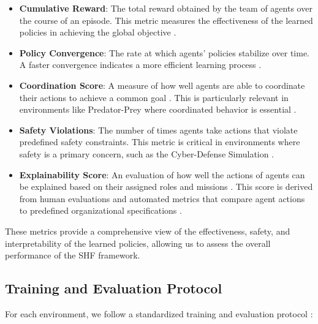 \documentclass[sigconf,anonymous]{aamas}
\begin{document}
\begin{itemize}
    \item \textbf{Cumulative Reward}: The total reward obtained by the team of agents over the course of an episode. This metric measures the effectiveness of the learned policies in achieving the global objective \cite{foerster2016learning, lowe2017multi}.
    \item \textbf{Policy Convergence}: The rate at which agents' policies stabilize over time. A faster convergence indicates a more efficient learning process \cite{lowe2017multi, foerster2018counterfactual}.
    \item \textbf{Coordination Score}: A measure of how well agents are able to coordinate their actions to achieve a common goal \cite{foerster2018counterfactual}. This is particularly relevant in environments like Predator-Prey where coordinated behavior is essential \cite{foerster2016learning}.
    \item \textbf{Safety Violations}: The number of times agents take actions that violate predefined safety constraints. This metric is critical in environments where safety is a primary concern, such as the Cyber-Defense Simulation \cite{bastani2018verifiable, wei2019safe}.
    \item \textbf{Explainability Score}: An evaluation of how well the actions of agents can be explained based on their assigned roles and missions \cite{ghosal2021explainable}. This score is derived from human evaluations and automated metrics that compare agent actions to predefined organizational specifications \cite{su2021toward}.
\end{itemize}


These metrics provide a comprehensive view of the effectiveness, safety, and interpretability of the learned policies, allowing us to assess the overall performance of the SHF framework.

\subsection{Training and Evaluation Protocol}
For each environment, we follow a standardized training and evaluation protocol \cite{foerster2018counterfactual, soule2024}:
\end{document}
